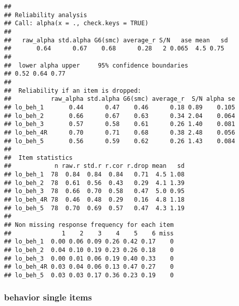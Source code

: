 \documentclass[]{article}
\newenvironment{Shaded}{\begin{snugshade}}{\end{snugshade}}
\newcommand{\KeywordTok}[1]{\textcolor[rgb]{0.13,0.29,0.53}{\textbf{#1}}}
\newcommand{\DataTypeTok}[1]{\textcolor[rgb]{0.13,0.29,0.53}{#1}}
\newcommand{\DecValTok}[1]{\textcolor[rgb]{0.00,0.00,0.81}{#1}}
\newcommand{\StringTok}[1]{\textcolor[rgb]{0.31,0.60,0.02}{#1}}
\newcommand{\CommentTok}[1]{\textcolor[rgb]{0.56,0.35,0.01}{\textit{#1}}}
\newcommand{\OperatorTok}[1]{\textcolor[rgb]{0.81,0.36,0.00}{\textbf{#1}}}
\newcommand{\NormalTok}[1]{#1}
\begin{document}
\begin{verbatim}
## 
## Reliability analysis   
## Call: alpha(x = ., check.keys = TRUE)
## 
##   raw_alpha std.alpha G6(smc) average_r S/N   ase mean   sd
##       0.64      0.67    0.68      0.28   2 0.065  4.5 0.75
## 
##  lower alpha upper     95% confidence boundaries
## 0.52 0.64 0.77 
## 
##  Reliability if an item is dropped:
##           raw_alpha std.alpha G6(smc) average_r  S/N alpha se
## lo_beh_1       0.44      0.47    0.46      0.18 0.89    0.105
## lo_beh_2       0.66      0.67    0.63      0.34 2.04    0.064
## lo_beh_3       0.57      0.58    0.61      0.26 1.40    0.081
## lo_beh_4R      0.70      0.71    0.68      0.38 2.48    0.056
## lo_beh_5       0.56      0.59    0.62      0.26 1.43    0.084
## 
##  Item statistics 
##            n raw.r std.r r.cor r.drop mean   sd
## lo_beh_1  78  0.84  0.84  0.84   0.71  4.5 1.08
## lo_beh_2  78  0.61  0.56  0.43   0.29  4.1 1.39
## lo_beh_3  78  0.66  0.70  0.58   0.47  5.0 0.95
## lo_beh_4R 78  0.46  0.48  0.29   0.16  4.8 1.18
## lo_beh_5  78  0.70  0.69  0.57   0.47  4.3 1.19
## 
## Non missing response frequency for each item
##              1    2    3    4    5    6 miss
## lo_beh_1  0.00 0.06 0.09 0.26 0.42 0.17    0
## lo_beh_2  0.04 0.10 0.19 0.23 0.26 0.18    0
## lo_beh_3  0.00 0.01 0.06 0.19 0.40 0.33    0
## lo_beh_4R 0.03 0.04 0.06 0.13 0.47 0.27    0
## lo_beh_5  0.03 0.03 0.17 0.36 0.23 0.19    0
\end{verbatim}

\begin{Shaded}
\end{Shaded}

\subsubsection{behavior single items}\label{behavior-single-items}

\begin{Shaded}
\end{Shaded}
\end{document}
